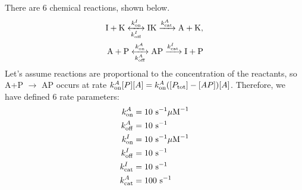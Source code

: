 \documentclass{exam}
\begin{document}
There are 6 chemical reactions, shown below. 
\begin{align}
\ce{ I + K <->[${k_{\rm on}^I}$][${k_{\rm off}^I}$] IK ->[${k_{\rm cat}^A}$] A + K  }, \\
\ce{ A + P <->[${k_{\rm on}^A}$][${k_{\rm off}^A}$] AP ->[${k_{\rm cat}^I}$] I + P  }
\end{align}
Let's assume reactions are proportional to the concentration of the reactants, so A+P $\rightarrow$ AP occurs at rate $k_{\rm on}^A [P] [A] = k_{\rm on}^A ([P_{\rm tot}] - [AP]) [A]$.
Therefore, we have defined 6 rate parameters: 
\begin{align*}
k_{\rm on}^A &= 10 ~\mbox{s}^{-1}\mu\mbox{M}^{-1}\\
k_{\rm off}^A &= 10 ~\mbox{s}^{-1} \\
k_{\rm on}^I &= 10 ~\mbox{s}^{-1}\mu\mbox{M}^{-1}\\
k_{\rm off}^I &= 10 ~\mbox{s}^{-1}\\
k_{\rm cat}^I &= 10 ~\mbox{s}^{-1}\\
k_{\rm cat}^A &= 100 ~\mbox{s}^{-1}
\end{align*}

\newpage
\end{document}
